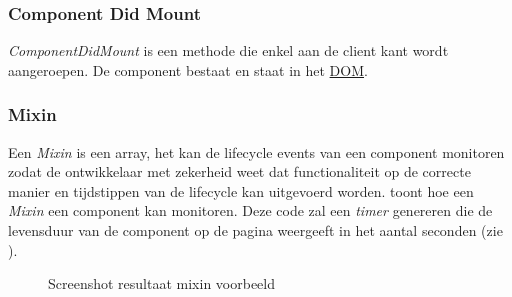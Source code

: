 	\subsubsection{Component Did Mount}
		
		\emph{ComponentDidMount} is een methode die enkel aan de client kant wordt aangeroepen. De component bestaat en staat in het \hyperref[dom]{DOM}.
	
	\subsubsection{Mixin}
		
		Een \emph{Mixin} is een array, het kan de lifecycle events van een component monitoren zodat de ontwikkelaar met zekerheid weet dat functionaliteit op de correcte manier en tijdstippen van de lifecycle kan uitgevoerd worden.  toont hoe een \emph{Mixin} een component kan monitoren. Deze code zal een \emph{timer} genereren die de levensduur van de component op de pagina weergeeft in het aantal seconden (zie ).
		
		
		\begin{figure}
			\centering
			\caption{Screenshot resultaat mixin voorbeeld}%
			\label{fig:timer}%
		\end{figure}
		
